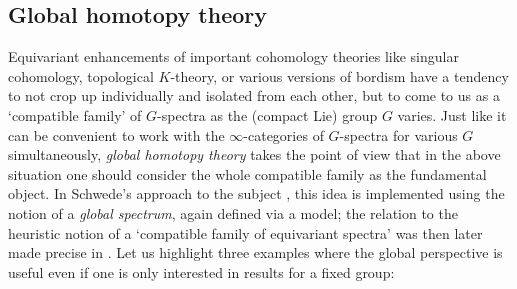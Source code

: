 \documentclass[reqno]{memo-l}
\theoremstyle{mythm}
\theoremstyle{definition}
\numberwithin{equation}{section}
\begin{document}
\subsection*{Global homotopy theory}
Equivariant enhancements of important cohomology theories like singular cohomology, topological $K$-theory, or various versions of bordism have a tendency to not crop up individually and isolated from each other, but to come to us as a `compatible family' of $G$-spectra as the (compact Lie) group $G$ varies. Just like it can be convenient to work with the $\infty$-categories of $G$-spectra for various $G$ simultaneously, \emph{global homotopy theory} takes the point of view that in the above situation one should consider the whole compatible family as the fundamental object. In Schwede's approach to the subject \cite{schwede2018global}, this idea is implemented using the notion of a \emph{global spectrum}, again defined via a model; the relation to the heuristic notion of a `compatible family of equivariant spectra' was then later made precise in \cite{LNP}.
Let us highlight three examples where the global perspective is useful even if one is only interested in results for a fixed group:
\end{document}
